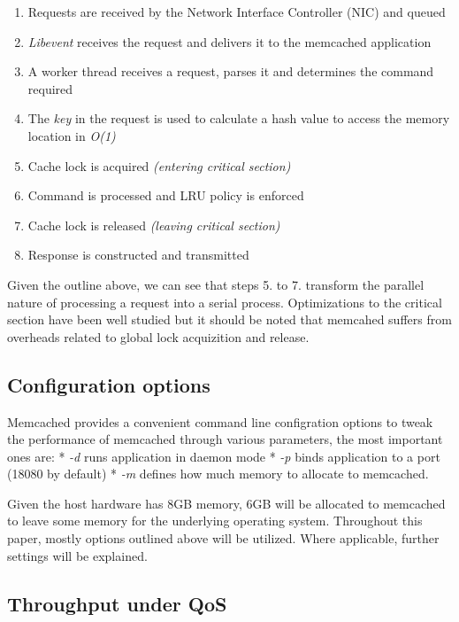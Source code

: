 \begin{enumerate}
\def\labelenumi{\arabic{enumi}.}
\tightlist
\item
  Requests are received by the Network Interface Controller (NIC) and
  queued
\item
  \emph{Libevent} receives the request and delivers it to the memcached
  application
\item
  A worker thread receives a request, parses it and determines the
  command required
\item
  The \emph{key} in the request is used to calculate a hash value to
  access the memory location in \emph{O(1)}
\item
  Cache lock is acquired \emph{(entering critical section)}
\item
  Command is processed and LRU policy is enforced
\item
  Cache lock is released \emph{(leaving critical section)}
\item
  Response is constructed and transmitted
\end{enumerate}

Given the outline above, we can see that steps 5. to 7. transform the
parallel nature of processing a request into a serial process.
Optimizations to the critical section have been well studied but it
should be noted that memcahed suffers from overheads related to global
lock acquizition and release.

\subsection{Configuration options}\label{configuration-options}

Memcached provides a convenient command line configration options to
tweak the performance of memcached through various parameters, the most
important ones are: * \emph{-d} runs application in daemon mode *
\emph{-p } binds application to a port (18080 by default) * \emph{-m }
defines how much memory to allocate to memcached.

Given the host hardware has 8GB memory, 6GB will be allocated to
memcached to leave some memory for the underlying operating system.
Throughout this paper, mostly options outlined above will be utilized.
Where applicable, further settings will be explained.

\subsection{Throughput under QoS}\label{throughput-under-qos}


